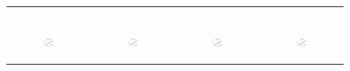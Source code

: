 \begin{figure}[ht]
\begin{tabular}{cccc}
\begin{subfigure}[b]{0.22\textwidth}
			\caption{}
			\label{appfig:runtime_zigzag_setcover}
	  \end{subfigure} \\
	  \begin{subfigure}[b]{0.22\textwidth}
	  	\includegraphics[width=110pt]{images/speedup_bigsynthetic_maxgraphcut.pdf}
			\caption{}
			\label{appfig:speedup_bigsynthetic_maxgraphcut}
	  \end{subfigure} &
	  \begin{subfigure}[b]{0.22\textwidth}
	  	\includegraphics[width=110pt]{images/speedup_bigsynthetic_setcover.pdf}
			\caption{}
			\label{appfig:speedup_bigsynthetic_setcover}
	  \end{subfigure} &
	  \begin{subfigure}[b]{0.22\textwidth}
	  	\includegraphics[width=110pt]{images/speedup_zigzag_maxgraphcut.pdf}
			\caption{}
			\label{appfig:speedup_zigzag_maxgraphcut}
	  \end{subfigure} &
	  \begin{subfigure}[b]{0.22\textwidth}
	  	\includegraphics[width=110pt]{images/speedup_zigzag_setcover.pdf}
			\caption{}

\end{subfigure}
\end{tabular}
\end{figure}
